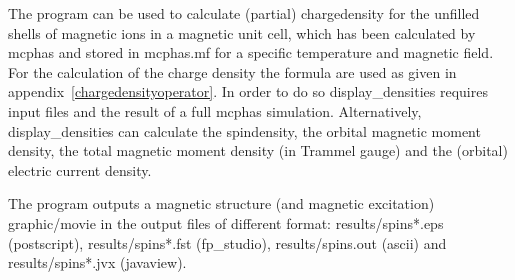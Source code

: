 The program can be used to calculate (partial) chargedensity for the unfilled shells
 of magnetic ions in  a magnetic unit cell, which has been calculated by {\prg mcphas} and
 stored in {\prg mcphas.mf} for a specific temperature and magnetic field.
   For the calculation of the charge density the  formula are used as given in
appendix~\ref{chargedensityoperator}. 
In order to do so {\prg display\_densities}  requires input files and the result of a
full {\prg mcphas} simulation.
Alternatively, {\prg display\_densities}
can  calculate the spindensity, the orbital magnetic moment density, the total magnetic
moment density (in Trammel gauge) and the (orbital) electric current density.

 The program outputs a magnetic structure (and magnetic excitation)
  graphic/movie in the output files of different format:
  results/spins*.eps (postscript), results/spins*.fst (fp\_studio),
  results/spins.out (ascii) and results/spins*.jvx (javaview).

